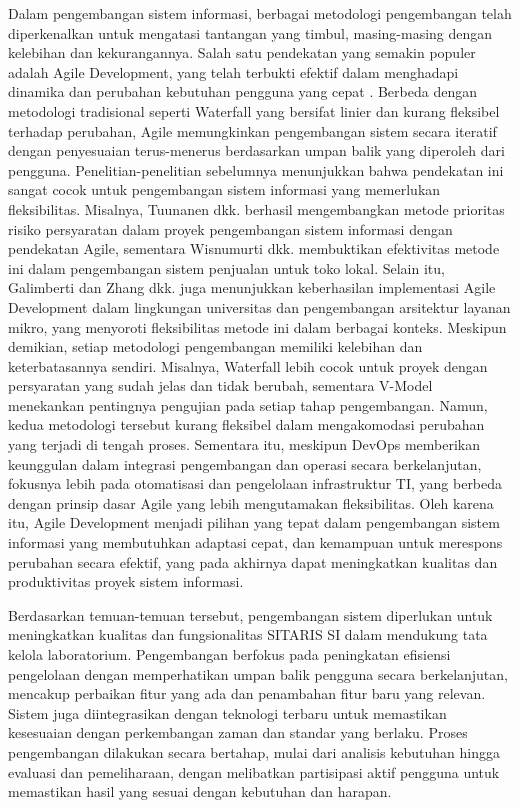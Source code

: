 Dalam pengembangan sistem informasi, berbagai metodologi pengembangan telah diperkenalkan untuk mengatasi tantangan yang timbul, masing-masing dengan kelebihan dan kekurangannya. Salah satu pendekatan yang semakin populer adalah Agile Development, yang telah terbukti efektif dalam menghadapi dinamika dan perubahan kebutuhan pengguna yang cepat \cite{al2020agile}. Berbeda dengan metodologi tradisional seperti Waterfall yang bersifat linier dan kurang fleksibel terhadap perubahan, Agile memungkinkan pengembangan sistem secara iteratif dengan penyesuaian terus-menerus berdasarkan umpan balik yang diperoleh dari pengguna. Penelitian-penelitian sebelumnya menunjukkan bahwa pendekatan ini sangat cocok untuk pengembangan sistem informasi yang memerlukan fleksibilitas. Misalnya, Tuunanen dkk. \citeyear{tuunanen2023development} berhasil mengembangkan metode prioritas risiko persyaratan dalam proyek pengembangan sistem informasi dengan pendekatan Agile, sementara Wisnumurti dkk. \citeyear{wisnumurti2022penerapan} membuktikan efektivitas metode ini dalam pengembangan sistem penjualan untuk toko lokal. Selain itu, Galimberti \citeyear{trelles2021agile} dan Zhang dkk. \citeyear{zhang2024establishment} juga menunjukkan keberhasilan implementasi Agile Development dalam lingkungan universitas dan pengembangan arsitektur layanan mikro, yang menyoroti fleksibilitas metode ini dalam berbagai konteks. Meskipun demikian, setiap metodologi pengembangan memiliki kelebihan dan keterbatasannya sendiri. Misalnya, Waterfall lebih cocok untuk proyek dengan persyaratan yang sudah jelas dan tidak berubah, sementara V-Model menekankan pentingnya pengujian pada setiap tahap pengembangan. Namun, kedua metodologi tersebut kurang fleksibel dalam mengakomodasi perubahan yang terjadi di tengah proses. Sementara itu, meskipun DevOps memberikan keunggulan dalam integrasi pengembangan dan operasi secara berkelanjutan, fokusnya lebih pada otomatisasi dan pengelolaan infrastruktur TI, yang berbeda dengan prinsip dasar Agile yang lebih mengutamakan fleksibilitas. Oleh karena itu, Agile Development menjadi pilihan yang tepat dalam pengembangan sistem informasi yang membutuhkan adaptasi cepat, dan kemampuan untuk merespons perubahan secara efektif, yang pada akhirnya dapat meningkatkan kualitas dan produktivitas proyek sistem informasi.

Berdasarkan temuan-temuan tersebut, pengembangan sistem diperlukan untuk meningkatkan kualitas dan fungsionalitas SITARIS SI dalam mendukung tata kelola laboratorium. Pengembangan berfokus pada peningkatan efisiensi pengelolaan dengan memperhatikan umpan balik pengguna secara berkelanjutan, mencakup perbaikan fitur yang ada dan penambahan fitur baru yang relevan. Sistem juga diintegrasikan dengan teknologi terbaru untuk memastikan kesesuaian dengan perkembangan zaman dan standar yang berlaku. Proses pengembangan dilakukan secara bertahap, mulai dari analisis kebutuhan hingga evaluasi dan pemeliharaan, dengan melibatkan partisipasi aktif pengguna untuk memastikan hasil yang sesuai dengan kebutuhan dan harapan.

